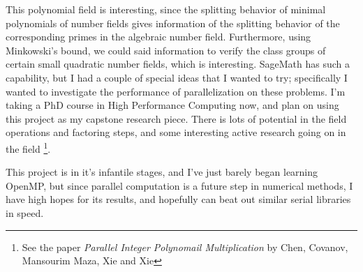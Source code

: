 \documentclass[12pt]{article}
\begin{document}
This polynomial field is interesting, since the splitting behavior of minimal 
polynomials of number fields gives information of the splitting behavior of the
corresponding primes in the algebraic number field. Furthermore, using
Minkowski's bound, we could said information to verify the class groups of
certain small quadratic number fields, which is interesting. SageMath has such a
capability, but I had a couple of special ideas that I wanted to try;
specifically I wanted to investigate the performance of parallelization on these
problems. I'm taking a PhD course in High Performance Computing now, and plan on
using this project as my capstone research piece. There is lots of potential in
the field operations and factoring steps, and some interesting active research
going on in the field \footnote{See the paper \textit{Parallel Integer
Polynomail Multiplication} by Chen, Covanov, Mansourim Maza, Xie and Xie}.

This project is in it's infantile stages, and I've just barely began learning
OpenMP, but since parallel computation is a future step in numerical methods, I
have high hopes for its results, and hopefully can beat out similar serial
libraries in speed.
\end{document}
